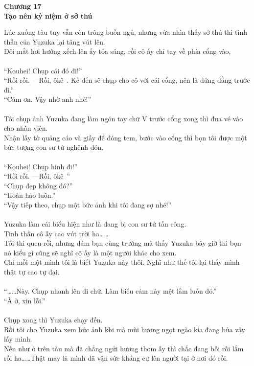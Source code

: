 \documentclass[12pt,a4paper, twosides]{book}
\begin{document}
    \begin{center}
    \textbf{\large Chương 17 \\ Tạo nên kỷ niệm ở sở thú}
    \end{center}
    \noindent
Lúc xuống tàu tuy vẫn còn trông buồn ngủ, nhưng vừa nhìn thấy sở thú thì tinh thần của Yuzuka lại tăng vút lên.\\
Đôi mắt hơi hướng xếch lên ấy tỏa sáng, rồi cô ấy chỉ tay về phía cổng vào,\\
\\
“Kouhei! Chụp cái đó đi!”\\
“Rồi rồi. —Rồi, ôkê~. Kế đến sẽ chụp cho cô với cái cổng, nên là đứng đằng trước đi.”\\
“Cảm ơn. Vậy nhờ anh nhé!”\\
\\
Tôi chụp ảnh Yuzuka đang làm ngón tay chữ V trước cổng xong thì đưa vé vào cho nhân viên.\\
Nhận lấy tờ quảng cáo và giấy để đóng tem, bước vào cổng thì bọn tôi được một bức tượng con sư tử nghênh đón.\\
\\
“Kouhei! Chụp hình đi!”\\
“Rồi rồi. —Rồi, ôkê~”\\
“Chụp đẹp không đó?”\\
“Hoàn hảo luôn.”\\
“Vậy tiếp theo, chụp một bức ảnh khi tôi đang sợ nhé!”\\
\\
Yuzuka làm cái biểu hiện như là đang bị con sư tử tấn công.\\
Tinh thần cô ấy cao vút trời ha……\\
Tôi thì quen rồi, nhưng đám bạn cùng trường mà thấy Yuzuka bây giờ thì bọn nó kiểu gì cũng sẽ nghĩ cô ấy là một người khác cho xem.\\
Chỉ mỗi một mình tôi là biết Yuzuka này thôi. Nghĩ như thế tôi lại thấy mình thật tự cao tự đại.\\
\\
“……Này. Chụp nhanh lên đi chứ. Làm biểu cảm này mệt lắm luôn đó.”\\
“À ờ, xin lỗi.”\\
\\
Chụp xong thì Yuzuka chạy đến.\\
Rồi tôi cho Yuzuka xem bức ảnh khi mà mùi hương ngọt ngào kia đang bủa vây lấy mình.\\
Nếu như ở trên tàu mà đã chẳng ngửi hương thơm ấy thì chắc đang bối rối lắm rồi ha……Thật may là mình đã vận sức kháng cự lên người tại ở nơi đó rồi.\\
\end{document}
